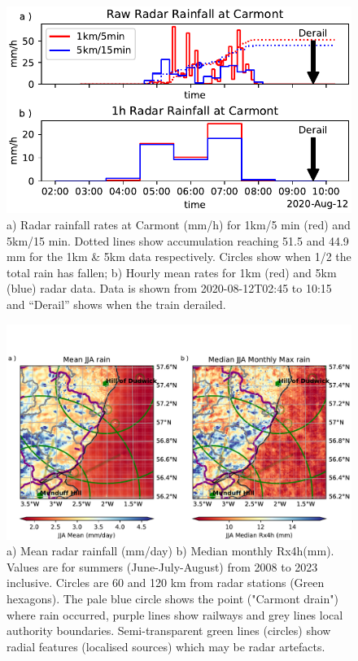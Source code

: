 \documentclass[11pt,a4paper]{article}
\begin{document}
\begin{figure}[ht!]
	\centering
	\includegraphics[width=0.5\linewidth]{radar_carmont}
	\caption{a) Radar rainfall rates at Carmont (mm/h) for 1km/5 min (red) and 5km/15 min. Dotted lines show accumulation reaching 51.5 and 44.9 mm for the 1km \& 5km data respectively. Circles show when 1/2 the total rain has fallen; b) Hourly mean rates for 1km (red) and 5km (blue) radar data. Data is shown from 2020-08-12T02:45 to 10:15 and ``Derail'' shows when the train derailed. }
	\label{fig:aug2020_rain}
\end{figure}

\begin{figure}[ht!]
	\centering
	\includegraphics[width=\linewidth]{radar_jja}
	\caption{a) Mean radar rainfall (mm/day) b) Median monthly Rx4h(mm). Values are for summers (June-July-August) from 2008 to 2023 inclusive. Circles are  60 and 120 km from radar stations (Green hexagons). The pale blue circle shows the point ("Carmont drain") where rain occurred, purple lines show railways and grey lines local authority boundaries. Semi-transparent green lines (circles) show radial features (localised sources) which may be radar artefacts. }
	\label{fig:radar_jja}
\end{figure}
\end{document}
